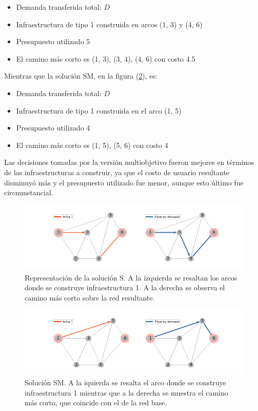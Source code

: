 \documentclass{article}
\begin{document}
  \begin{itemize}
    \item{Demanda transferida total: $D$}
    \item{Infraestructura de tipo 1 construida en arcos (1, 3) y (4, 6)}
    \item{Presupuesto utilizado 5}
    \item{El camino más corto es (1, 3), (3, 4), (4, 6) con costo 4.5}
  \end{itemize}

  Mientras que la solución SM, en la figura (\ref{fig:example2solv1}), es:

  \begin{itemize}
    \item{Demanda transferida total: $D$}
    \item{Infraestructura de tipo 1 construida en el arco (1, 5)}
    \item{Presupuesto utilizado 4}
    \item{El camino más corto es (1, 5), (5, 6) con costo 4}
  \end{itemize}

  Las decisiones tomadas por la versión multiobjetivo fueron mejores en términos de las infraestructuras a construir, ya que el costo de usuario resultante disminuyó más y el presupuesto utilizado fue menor, aunque esto último fue circnunstancial.

  \begin{figure}[h!]
    \centering
    \includegraphics[width=12cm]{../resources/example_2_sol_v2.png}
      \caption{Representación de la solución S. A la izquierda se resaltan los arcos donde se construye infraestructura 1. A la derecha se observa el camino más corto sobre la red resultante.}
    \label{fig:example2solv2}
  \end{figure}

  \begin{figure}[h!]
    \centering
    \includegraphics[width=12cm]{../resources/example_2_sol_v1.png}
      \caption{Solución SM. A la iquierda se resalta el arco donde se construye infraestructura 1 mientras que a la derecha se muestra el camino más corto, que coincide con el de la red base.}
    \label{fig:example2solv1}
  \end{figure}
\end{document}
